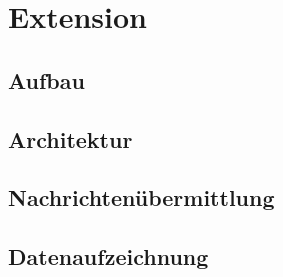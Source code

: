 %
%
%
%

\section{Extension}


\subsection{Aufbau}

\subsection{Architektur}

\subsection{Nachrichtenübermittlung}

\subsection{Datenaufzeichnung}
